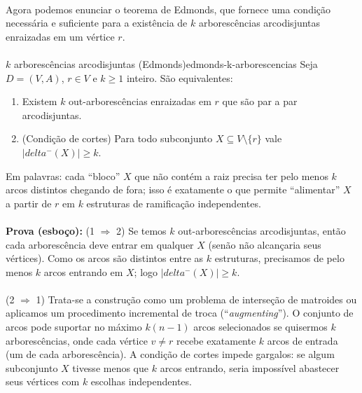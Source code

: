 \documentclass[12pt,a4paper]{article}
\def\emph#1{#1}%
\def\delta{delta}%
\begin{document}
\paragraph{}
Agora podemos enunciar o teorema de Edmonds, que fornece uma condição necessária e suficiente para a existência de \(k\) arborescências arcodisjuntas enraizadas em um vértice \(r\).

\paragraph{}
\begin{teobox}{$k$ arborescências arcodisjuntas (Edmonds)}{edmonds-k-arborescencias}
    Seja $D=(V,A)$, $r\in V$ e $k\ge 1$ inteiro. São equivalentes:
    \begin{enumerate}\setlength{\itemsep}{4pt}
        \item Existem $k$ out-arborescências enraizadas em $r$ que são par a par \emph{arcodisjuntas}.
        \item (Condição de cortes) Para todo subconjunto $X\subseteq V\setminus\{r\}$ vale $|\delta^-(X)| \ge k$.
    \end{enumerate}
    Em palavras: cada “bloco” $X$ que não contém a raiz precisa ter pelo menos $k$ arcos distintos chegando de fora; isso é exatamente o que permite ``alimentar'' $X$ a partir de $r$ em $k$ estruturas de ramificação independentes.

    \paragraph{}
    \textbf{Prova (esboço):}
    \emph{(1 $\Rightarrow$ 2)} Se temos $k$ out-arborescências arcodisjuntas, então cada arborescência deve entrar em qualquer $X$ (senão não alcançaria seus vértices). Como os arcos são distintos entre as $k$ estruturas, precisamos de pelo menos $k$ arcos entrando em $X$; logo $|\delta^-(X)|\ge k$.

    \paragraph{}
    \emph{(2 $\Rightarrow$ 1)} Trata-se a construção como um problema de \emph{interseção de matroides} ou aplicamos um procedimento incremental de troca (``\textit{augmenting}''). O conjunto de arcos pode suportar no máximo $k(n-1)$ arcos selecionados se quisermos $k$ arborescências, onde cada vértice $v \neq r$ recebe exatamente $k$ arcos de entrada (um de cada arborescência). A condição de cortes impede gargalos: se algum subconjunto $X$ tivesse menos que $k$ arcos entrando, seria impossível abastecer seus vértices com $k$ escolhas independentes.


\end{teobox}
\end{document}

